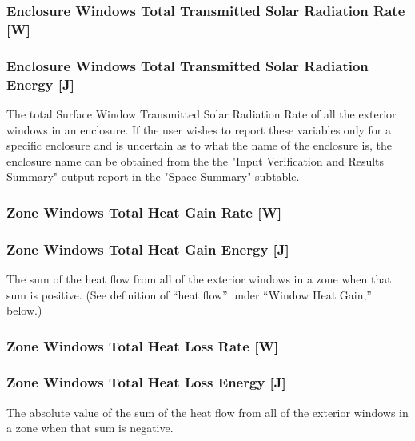 \subsubsection{Enclosure Windows Total Transmitted Solar Radiation Rate {[}W{]}}\label{zone-windows-total-transmitted-solar-radiation-rate-w}

\subsubsection{Enclosure Windows Total Transmitted Solar Radiation Energy {[}J{]}}\label{zone-windows-total-transmitted-solar-radiation-energy-j}

The total Surface Window Transmitted Solar Radiation Rate of all the exterior windows in an enclosure. If the user wishes to report these variables only for a specific enclosure and is uncertain as to what the name of the enclosure is, the enclosure name can be obtained from the the "Input Verification and Results Summary" output report in the "Space Summary" subtable.

\subsubsection{Zone Windows Total Heat Gain Rate {[}W{]}}\label{zone-windows-total-heat-gain-rate-w}

\subsubsection{Zone Windows Total Heat Gain Energy {[}J{]}}\label{zone-windows-total-heat-gain-energy-j}

The sum of the heat flow from all of the exterior windows in a zone when that sum is positive. (See definition of ``heat flow'' under ``Window Heat Gain,'' below.)

\subsubsection{Zone Windows Total Heat Loss Rate {[}W{]}}\label{zone-windows-total-heat-loss-rate-w}

\subsubsection{Zone Windows Total Heat Loss Energy {[}J{]}}\label{zone-windows-total-heat-loss-energy-j}

The absolute value of the sum of the heat flow from all of the exterior windows in a zone when that sum is negative.

